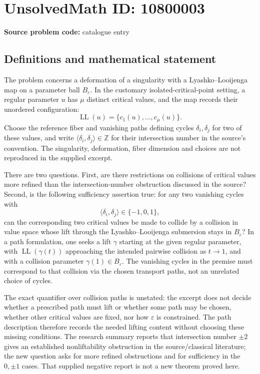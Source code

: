 \documentclass[11pt]{article}
\newcommand{\Z}{\mathbb{Z}}
\begin{document}
\section*{UnsolvedMath ID: 10800003}
\textbf{Source problem code:} catalogue entry
\subsection{Definitions and mathematical statement}
The problem concerns a deformation of a singularity with a Lyashko--Looijenga map on a parameter ball \(B_\varepsilon\). In the customary isolated-critical-point setting, a regular parameter \(u\) has \(\mu\) distinct critical values, and the map records their unordered configuration:
\[\operatorname{LL}(u)=\{c_1(u),\ldots,c_\mu(u)\}.\]
Choose the reference fiber and vanishing paths defining cycles \(\delta_i,\delta_j\) for two of these values, and write \(\langle\delta_i,\delta_j\rangle\in\Z\) for their intersection number in the source's convention. The singularity, deformation, fiber dimension and choices are not reproduced in the supplied excerpt.

There are two questions. First, are there restrictions on collisions of critical values more refined than the intersection-number obstruction discussed in the source? Second, is the following sufficiency assertion true: for any two vanishing cycles with
\[\langle\delta_i,\delta_j\rangle\in\{-1,0,1\},\]
can the corresponding two critical values be made to collide by a collision in value space whose lift through the Lyashko--Looijenga submersion stays in \(B_\varepsilon\)? In a path formulation, one seeks a lift \(\gamma\) starting at the given regular parameter, with \(\operatorname{LL}(\gamma(t))\) approaching the intended pairwise collision as \(t\to1\), and with a collision parameter \(\gamma(1)\in B_\varepsilon\). The vanishing cycles in the premise must correspond to that collision via the chosen transport paths, not an unrelated choice of cycles.

The exact quantifier over collision paths is unstated: the excerpt does not decide whether a prescribed path must lift or whether some path may be chosen, whether other critical values are fixed, nor how \(\varepsilon\) is constrained. The path description therefore records the needed lifting content without choosing these missing conditions. The research summary reports that intersection number \(\pm2\) gives an established nonliftability obstruction in the source/classical literature; the new question asks for more refined obstructions and for sufficiency in the \(0,\pm1\) cases. That supplied negative report is not a new theorem proved here.
\end{document}
